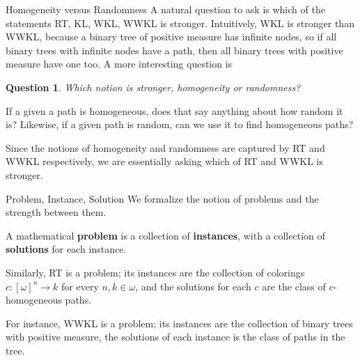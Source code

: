 \begin{frame}{Homogeneity versus Randomness}
  A natural question to ask is which of the statements RT, KL, WKL, WWKL is
  stronger. Intuitively, WKL is stronger than WWKL, because a binary tree
  of positive measure has infinite nodes, so if all binary trees with
  infinite nodes have a path, then all binary trees with positive measure
  have one too. A more interesting question is
  \newtheorem*{question*}{Question}
  \begin{question*}
    Which notion is stronger, homogeneity or randomness?
  \end{question*}
  If a given a path is homogeneous, does that say anything about how random
  it is? Likewise, if a given path is random, can we use it to find
  homogeneous paths?

  \vspace{0.5em}
  Since the notions of homogeneity and randomness are captured by RT and
  WWKL respectively, we are essentially asking which of RT and WWKL is
  stronger.
\end{frame}

\begin{frame}{Problem, Instance, Solution}
  We formalize the notion of problems and the strength between them.

  \vspace{1em}
  \begin{define*}
    A mathematical \textbf{problem} is a collection of \textbf{instances},
    with a collection of \textbf{solutions} for each instance.
  \end{define*}

  \vspace{1em}
  Similarly, RT is a problem; its instances are the collection of colorings
  $c:[\omega]^n\rightarrow k$ for every $n,k\in\omega$, and the solutions
  for each $c$ are the class of $c$-homogeneous paths.

  \vspace{1em}
  For instance, WWKL is a problem; its instances are the collection of
  binary trees with positive measure, the solutions of each instance is the
  class of paths in the tree.
\end{frame}

